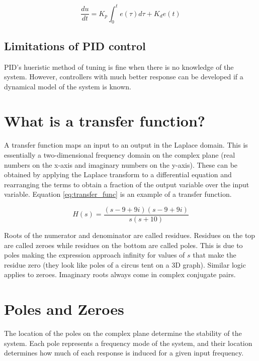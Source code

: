 \documentclass[10pt,conference,compsoc]{IEEEtran}
\begin{document}
\begin{equation}
  \frac{du}{dt} = K_p \int_0^t e(\tau) d\tau + K_d e(t)
\end{equation}

\subsection{Limitations of PID control}

\noindent PID's hueristic method of tuning is fine when there is no knowledge of
the system. However, controllers with much better response can be developed if a
dynamical model of the system is known.

\section{What is a transfer function?}

\noindent A transfer function maps an input to an output in the Laplace domain.
This is essentially a two-dimensional frequency domain on the complex plane
(real numbers on the x-axis and imaginary numbers on the y-axis). These can be
obtained by applying the Laplace transform to a differential equation and
rearranging the terms to obtain a fraction of the output variable over the input
variable. Equation \ref{eq:transfer_func} is an example of a transfer function.

\begin{equation} \label{eq:transfer_func}
  H(s) = \frac{(s-9+9i)(s-9+9i)}{s(s+10)}
\end{equation}

\noindent Roots of the numerator and denominator are called residues. Residues
on the top are called zeroes while residues on the bottom are called poles. This
is due to poles making the expression approach infinity for values of $s$ that
make the residue zero (they look like poles of a circus tent on a 3D graph).
Similar logic applies to zeroes. Imaginary roots always come in complex
conjugate pairs.

\section{Poles and Zeroes}

\noindent The location of the poles on the complex plane determine the stability
of the system. Each pole represents a frequency mode of the system, and their
location determines how much of each response is induced for a given input
frequency.
\end{document}
